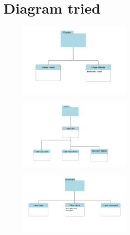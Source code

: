 \documentclass[12pt]{article}
\begin{document}
\section{Diagram tried}
\begin{figure}[h]
\centering 
\includegraphics[width=0.5\textwidth]{img/1.png}
\end{figure}
\begin{figure}[h]
\centering 
\includegraphics[width=0.5\textwidth]{img/2.png}
\end{figure}
\begin{figure}[h]
\centering 
\includegraphics[width=0.5\textwidth]{img/3.png}
\end{figure}
\end{document}
